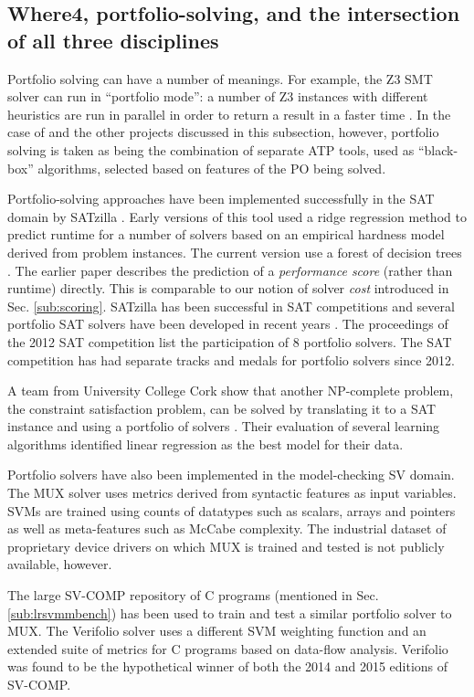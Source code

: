 \subsection{Where4, portfolio-solving, and the intersection of all three disciplines}
\label{sub:lrsvmmml}

Portfolio solving can have a number of meanings. For example, the Z3 SMT solver can run in ``portfolio mode'': a number of Z3 instances with different heuristics are run in parallel in order to return a result in a faster time \cite{WintersteigerHM09}. In the case of \where and the other projects discussed in this subsection, however, portfolio solving is taken as being the combination of separate ATP tools, used as ``black-box'' algorithms, selected based on features of the PO being solved.

Portfolio-solving approaches have been implemented successfully in the SAT domain by SATzilla \cite{Satzilla}. Early versions of this tool used a ridge regression method to predict runtime for a number of solvers based on an empirical hardness model derived from problem instances. The current version \cite{SATzilla2012} use a forest of decision trees . The earlier paper describes the prediction of a \textit{performance score} (rather than runtime) directly.  This is comparable to our notion of solver \textit{cost} introduced in Sec. \ref{sub:scoring}. SATzilla has been successful in SAT competitions and several portfolio SAT solvers have been developed in recent years \cite{SAT2012}.  The proceedings of the 2012 SAT competition 
list the participation of 8 portfolio solvers. The SAT competition has had separate tracks and medals for portfolio solvers since 2012.  

A team from University College Cork show that another NP-complete problem, the constraint satisfaction problem, can be solved by translating it to a SAT instance and using a portfolio of solvers \cite{Hurley2014}. Their evaluation of several learning algorithms identified linear regression as the best model for their data.

Portfolio solvers have also been implemented in the model-checking SV domain. The MUX \cite{MUX} solver uses metrics derived from syntactic features as input variables. SVMs are trained using counts of datatypes such as scalars, arrays and pointers as well as meta-features such as McCabe complexity. The industrial dataset of proprietary device drivers on which MUX is trained and tested is not publicly available, however.   

The large SV-COMP repository of C programs (mentioned in Sec. \ref{sub:lrsvmmbench}) has been used to train and test a similar portfolio solver to MUX. The Verifolio \cite{DPVZ15:CAV} solver uses a different SVM weighting function and an extended suite of metrics for C programs based on data-flow analysis. Verifolio was found to be the hypothetical winner of both the 2014 and 2015 editions of SV-COMP. 

